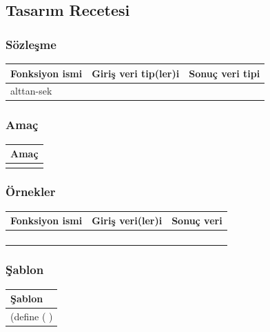 \documentclass[12pt, a4paper]{article}
\newcommand\fillin[1][3cm]{\makebox[#1]{\dotfill}}
\begin{document}
\newpage
\subsection*{Tasarım Recetesi}
\subsubsection*{Sözleşme}
\begin{tabular}{| p{4cm} | p{8cm} | p{4cm} |  }
\hline			
Fonksiyon ismi&Giriş veri tip(ler)i&Sonuç veri tipi\\
\hline
alttan-sek& & \\[10ex]
\hline  
\end{tabular}

\subsubsection*{Amaç}
\begin{tabular}{| p{17cm} |  }
\hline			
Amaç\\
\hline
 \\[10ex]
\hline  
\end{tabular}

\subsubsection*{Örnekler}
\begin{tabular}{| p{4cm} | p{8cm} | p{4cm} |  }
\hline			
Fonksiyon ismi&Giriş veri(ler)i&Sonuç veri\\
\hline
& & \\[6ex]
\hline  
& & \\[6ex]
\hline  
& & \\[6ex]
\hline  
& & \\[6ex]
\hline  
\end{tabular}

\subsubsection*{Şablon}
\begin{tabular}{| p{17cm} |  }
\hline			
Şablon\\
\hline
\vspace{0,2cm}
(define (\fillin[2cm] \hspace{1cm}  \fillin[8cm] ) \\[30ex]
\hline  
\end{tabular}
\end{document}
